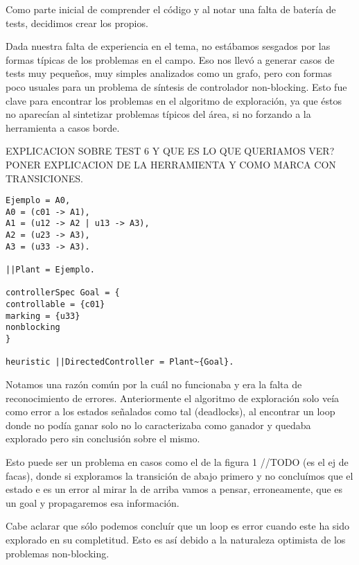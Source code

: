 
Como parte inicial de comprender el código y al notar una falta de batería de tests, decidimos crear los propios. 


Dada nuestra falta de experiencia en el tema, no estábamos sesgados por las formas típicas de los problemas en el campo. Eso nos llevó a generar casos de tests muy pequeños, muy simples analizados como un grafo, pero con formas poco usuales para un problema de síntesis de controlador non-blocking. Esto fue clave para encontrar los problemas en el algoritmo de exploración, ya que éstos no aparecían al sintetizar problemas típicos del área, si no forzando a la herramienta a casos borde.  

EXPLICACION SOBRE TEST 6 Y QUE ES LO QUE QUERIAMOS VER? PONER EXPLICACION DE LA HERRAMIENTA Y COMO MARCA CON TRANSICIONES.

\begin{lstlisting}[language = mtsa, caption=Test 1]
Ejemplo = A0,
A0 = (c01 -> A1),
A1 = (u12 -> A2 | u13 -> A3),
A2 = (u23 -> A3),
A3 = (u33 -> A3).

||Plant = Ejemplo.

controllerSpec Goal = {
controllable = {c01}
marking = {u33}
nonblocking
}

heuristic ||DirectedController = Plant~{Goal}.

\end{lstlisting}

Notamos una razón común por la cuál no funcionaba y era la falta de reconocimiento de errores. Anteriormente el algoritmo de exploración solo veía como error a los estados señalados como tal (deadlocks), al encontrar un loop donde no podía ganar solo no lo caracterizaba como ganador y quedaba explorado pero sin conclusión sobre el mismo.

Esto puede ser un problema en casos como el de la figura 1 //TODO (es el ej de facas), donde si exploramos la transición de abajo primero y no concluímos que el estado e es un error al mirar la de arriba vamos a pensar, erroneamente, que es un goal y propagaremos esa información.

Cabe aclarar que sólo podemos concluír que un loop es error cuando este ha sido explorado en su completitud. Esto es así debido a la naturaleza optimista de los problemas non-blocking.
